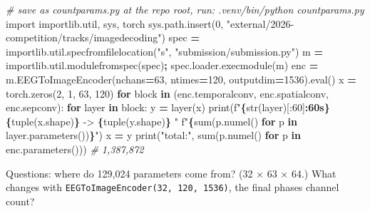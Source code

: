 \documentclass[
  11pt,
]{article}
\newenvironment{Shaded}{\begin{snugshade}}{\end{snugshade}}
\newcommand{\BuiltInTok}[1]{#1}
\newcommand{\CommentTok}[1]{\textcolor[rgb]{0.56,0.35,0.01}{\textit{#1}}}
\newcommand{\ControlFlowTok}[1]{\textcolor[rgb]{0.13,0.29,0.53}{\textbf{#1}}}
\newcommand{\DecValTok}[1]{\textcolor[rgb]{0.00,0.00,0.81}{#1}}
\newcommand{\ImportTok}[1]{#1}
\newcommand{\KeywordTok}[1]{\textcolor[rgb]{0.13,0.29,0.53}{\textbf{#1}}}
\newcommand{\NormalTok}[1]{#1}
\newcommand{\OperatorTok}[1]{\textcolor[rgb]{0.81,0.36,0.00}{\textbf{#1}}}
\newcommand{\SpecialCharTok}[1]{\textcolor[rgb]{0.81,0.36,0.00}{\textbf{#1}}}
\newcommand{\SpecialStringTok}[1]{\textcolor[rgb]{0.31,0.60,0.02}{#1}}
\newcommand{\StringTok}[1]{\textcolor[rgb]{0.31,0.60,0.02}{#1}}
\renewcommand{\_}{\oldunderscore\allowbreak}
\begin{document}
\begin{Shaded}
\begin{Highlighting}[]
\CommentTok{\# save as count\_params.py at the repo root, run: .venv/bin/python count\_params.py}
\ImportTok{import}\NormalTok{ importlib.util, sys, torch}
\NormalTok{sys.path.insert(}\DecValTok{0}\NormalTok{, }\StringTok{"external/2026{-}competition/tracks/image\_decoding"}\NormalTok{)}
\NormalTok{spec }\OperatorTok{=}\NormalTok{ importlib.util.spec\_from\_file\_location(}\StringTok{"s"}\NormalTok{, }\StringTok{"submission/submission.py"}\NormalTok{)}
\NormalTok{m }\OperatorTok{=}\NormalTok{ importlib.util.module\_from\_spec(spec)}\OperatorTok{;}\NormalTok{ spec.loader.exec\_module(m)}
\NormalTok{enc }\OperatorTok{=}\NormalTok{ m.EEGToImageEncoder(n\_chans}\OperatorTok{=}\DecValTok{63}\NormalTok{, n\_times}\OperatorTok{=}\DecValTok{120}\NormalTok{, output\_dim}\OperatorTok{=}\DecValTok{1536}\NormalTok{).}\BuiltInTok{eval}\NormalTok{()}
\NormalTok{x }\OperatorTok{=}\NormalTok{ torch.zeros(}\DecValTok{2}\NormalTok{, }\DecValTok{1}\NormalTok{, }\DecValTok{63}\NormalTok{, }\DecValTok{120}\NormalTok{)}
\ControlFlowTok{for}\NormalTok{ block }\KeywordTok{in}\NormalTok{ (enc.temporal\_conv, enc.spatial\_conv, enc.sep\_conv):}
    \ControlFlowTok{for}\NormalTok{ layer }\KeywordTok{in}\NormalTok{ block:}
\NormalTok{        y }\OperatorTok{=}\NormalTok{ layer(x)}
        \BuiltInTok{print}\NormalTok{(}\SpecialStringTok{f"}\SpecialCharTok{\{}\BuiltInTok{str}\NormalTok{(layer)[:}\DecValTok{60}\NormalTok{]}\SpecialCharTok{:60s\}}\SpecialStringTok{ }\SpecialCharTok{\{}\BuiltInTok{tuple}\NormalTok{(x.shape)}\SpecialCharTok{\}}\SpecialStringTok{ {-}\textgreater{} }\SpecialCharTok{\{}\BuiltInTok{tuple}\NormalTok{(y.shape)}\SpecialCharTok{\}}\SpecialStringTok{ "}
              \SpecialStringTok{f"}\SpecialCharTok{\{}\BuiltInTok{sum}\NormalTok{(p.numel() }\ControlFlowTok{for}\NormalTok{ p }\KeywordTok{in}\NormalTok{ layer.parameters())}\SpecialCharTok{\}}\SpecialStringTok{"}\NormalTok{)}
\NormalTok{        x }\OperatorTok{=}\NormalTok{ y}
\BuiltInTok{print}\NormalTok{(}\StringTok{"total:"}\NormalTok{, }\BuiltInTok{sum}\NormalTok{(p.numel() }\ControlFlowTok{for}\NormalTok{ p }\KeywordTok{in}\NormalTok{ enc.parameters()))  }\CommentTok{\# 1,387,872}
\end{Highlighting}
\end{Shaded}

Questions: where do 129,024 parameters
come from? (32 × 63 × 64.) What changes
with
\texttt{EEGToImageEncoder(32,\ 120,\ 1536)},
the final phase\textquotesingle s
channel count?
\end{document}
